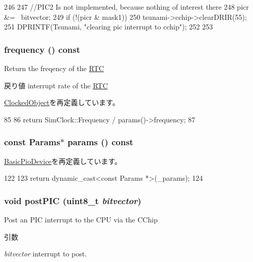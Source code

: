 \begin{DoxyCode}
246 {
247     //PIC2 Is not implemented, because nothing of interest there
248     picr &= ~bitvector;
249     if (!(picr & mask1)) {
250         tsunami->cchip->clearDRIR(55);
251         DPRINTF(Tsunami, "clearing pic interrupt to cchip\n");
252     }
253 }
\end{DoxyCode}
\hypertarget{classTsunamiIO_ae7d31c6aab76d9d4e74e5e7227337651}{
\subsubsection[{frequency}]{ frequency () const}}
\label{classTsunamiIO_ae7d31c6aab76d9d4e74e5e7227337651}
Return the freqency of the \hyperlink{classTsunamiIO_1_1RTC}{RTC} \begin{DoxyReturn}{戻り値}
interrupt rate of the \hyperlink{classTsunamiIO_1_1RTC}{RTC} 
\end{DoxyReturn}


\hyperlink{classClockedObject_a47ad0ff313f0dcb63b8223b1f11d49d8}{ClockedObject}を再定義しています。


\begin{DoxyCode}
85 {
86     return SimClock::Frequency / params()->frequency;
87 }
\end{DoxyCode}
\hypertarget{classTsunamiIO_acd3c3feb78ae7a8f88fe0f110a718dff}{
\subsubsection[{params}]{\setlength{\rightskip}{0pt plus 5cm}const {\bf Params}$\ast$ params () const}}
\label{classTsunamiIO_acd3c3feb78ae7a8f88fe0f110a718dff}


\hyperlink{classBasicPioDevice_acd3c3feb78ae7a8f88fe0f110a718dff}{BasicPioDevice}を再定義しています。


\begin{DoxyCode}
122     {
123         return dynamic_cast<const Params *>(_params);
124     }
\end{DoxyCode}
\hypertarget{classTsunamiIO_a4b01cbf1b633d5c31fdf43b661f222e1}{
\subsubsection[{postPIC}]{\setlength{\rightskip}{0pt plus 5cm}void postPIC (uint8\_\-t {\em bitvector})}}
\label{classTsunamiIO_a4b01cbf1b633d5c31fdf43b661f222e1}
Post an PIC interrupt to the CPU via the CChip 
\begin{DoxyParams}{引数}
\item[{\em bitvector}]interrupt to post. \end{DoxyParams}



